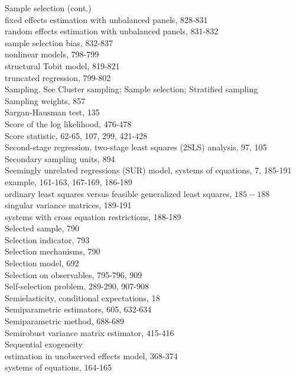 \documentclass[10pt]{article}
\begin{document}
Sample selection (cont.)\\
fixed effects estimation with unbalanced panels, 828-831\\
random effects estimation with unbalanced panels, 831-832\\
sample selection bias, 832-837\\
nonlinear models, 798-799\\
structural Tobit model, 819-821\\
truncated regression, 799-802\\
Sampling. See Cluster sampling; Sample selection; Stratified sampling\\
Sampling weights, 857\\
Sargan-Hausman test, 135\\
Score of the log likelihood, 476-478\\
Score statistic, 62-65, 107, 299, 421-428\\
Second-stage regression, two-stage least squares (2SLS) analysis, 97, 105\\
Secondary sampling units, 894\\
Seemingly unrelated regressions (SUR) model, systems of equations, 7, 185-191\\
example, 161-163, 167-169, 186-189\\
ordinary least squares versus feasible generalized least squares, $185-188$\\
singular variance matrices, 189-191\\
systems with cross equation restrictions, 188-189\\
Selected sample, 790\\
Selection indicator, 793\\
Selection mechanisms, 790\\
Selection model, 692\\
Selection on observables, 795-796, 909\\
Self-selection problem, 289-290, 907-908\\
Semielasticity, conditional expectations, 18\\
Semiparametric estimators, 605, 632-634\\
Semiparametric method, 688-689\\
Semirobust variance matrix estimator, 415-416\\
Sequential exogeneity\\
estimation in unobserved effects model, 368-374\\
systems of equations, 164-165\\
\end{document}
